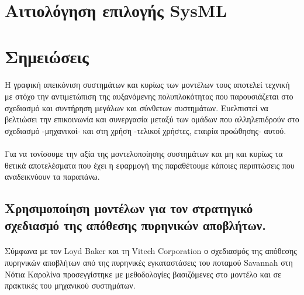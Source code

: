 \documentclass[a4paper,12pt,twoside]{report}
\begin{document}
{		\section{Αιτιολόγηση επιλογής SysML}
		
		\section{Σημειώσεις}
			\paragraph{}{
				H γραφική απεικόνιση συστημάτων και κυρίως των μοντέλων τους αποτελεί τεχνική με στόχο την αντιμετώπιση της αυξανόμενης πολυπλοκότητας που παρουσιάζεται στο σχεδιασμό και συντήρηση μεγάλων και σύνθετων συστημάτων. Ευελπιστεί να βελτιώσει  την επικοινωνία και συνεργασία μεταξύ των ομάδων που αλληλεπιδρούν στο σχεδιασμό -μηχανικοί- και στη χρήση -τελικοί χρήστες, εταιρία προώθησης- αυτού. \cite{SMSpacecraft}
				}
			\paragraph{} {Για να τονίσουμε την αξία της μοντελοποίησης συστημάτων και μη και κυρίως τα θετικά αποτελέσματα που έχει η εφαρμογή της παραθέτουμε κάποιες περιπτώσεις που αναδεικνύουν τα παραπάνω.
			}
			
			\subsection{Χρησιμοποίηση μοντέλων  για τον στρατηγικό σχεδιασμό της απόθεσης πυρηνικών αποβλήτων.}
			
				\paragraph{} {Σύμφωνα με τον Loyd Baker και τη Vitech Corporation \cite{MBEStrategicPlanActivity} ο σχεδιασμός της απόθεσης πυρηνικών αποβλήτων  από της πυρηνικές εγκαταστάσεις του ποταμού Savannah στη Νότια Καρολίνα προσεγγίστηκε με μεθοδολογίες βασιζόμενες στο μοντέλο και σε πρακτικές του μηχανικού συστημάτων.
				}
}
\end{document}
